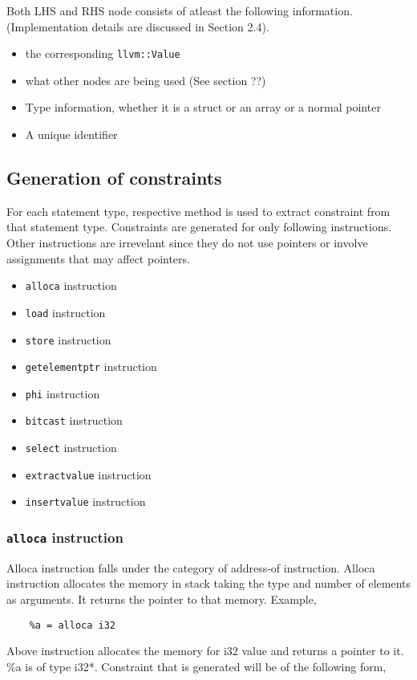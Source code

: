 \documentclass[a4paper,11pt]{report}
\begin{document}
\noindent
Both LHS and RHS node consists of atleast the following information. 
(Implementation details are discussed in Section 2.4).

\begin{itemize}
    \item the corresponding \texttt{llvm::Value}
    \item what other nodes are being used (See section ??)
    \item Type information, whether it is a struct or an array or a normal 
pointer
    \item A unique identifier
\end{itemize}

\subsection{Generation of constraints}
For each statement type, respective method is used to extract constraint from
that statement type. Constraints are generated for only following instructions.
Other instructions are irrevelant since they do not use pointers or involve
assignments that may affect pointers.

\begin{itemize}
    \item \texttt{alloca} instruction
    \item \texttt{load} instruction
    \item \texttt{store} instruction
    \item \texttt{getelementptr} instruction
    \item \texttt{phi} instruction
    \item \texttt{bitcast} instruction
    \item \texttt{select} instruction
    \item \texttt{extractvalue} instruction
    \item \texttt{insertvalue} instruction
\end{itemize}

\subsubsection{\texttt{alloca} instruction}
Alloca instruction falls under the category of address-of instruction. Alloca 
instruction allocates the memory in stack taking the type and number of 
elements as arguments. It returns the pointer to that memory. 
Example,

\begin{lstlisting}
    %a = alloca i32
\end{lstlisting}
\noindent
Above instruction allocates the memory for i32 value and returns a pointer to 
it. \%a is of type i32*. Constraint that is generated will be of the following 
form,
\end{document}
